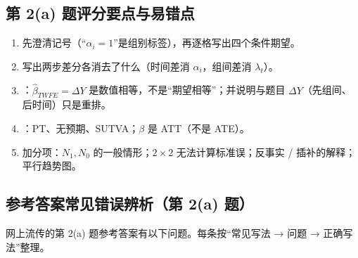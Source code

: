 \subsection{第 2(a) 题评分要点与易错点}

\begin{keypt}[第 2(a) 题评分要点]
\begin{enumerate}
  \item 先澄清记号（“$\alpha_i=1$”是组别标签），再逐格写出四个条件期望。
  \item 写出两步差分各消去了什么（时间差消 $\alpha_i$，组间差消 $\lambda_t$）。
  \item {}：$\hat\beta_{TWFE}=\Delta Y$ 是数值相等，不是“期望相等”；并说明与题目 $\Delta Y$（先组间、后时间）只是重排。
  \item {}：PT、无预期、SUTVA；$\beta$ 是 ATT（不是 ATE）。
  \item 加分项：$N_1,N_0$ 的一般情形；$2\times2$ 无法计算标准误；反事实 / 插补的解释；平行趋势图。
\end{enumerate}
\end{keypt}

\subsection{参考答案常见错误辨析（第 2(a) 题）}\label{sec:U17b-err2a}

网上流传的第 2(a) 题参考答案有以下问题。每条按“常见写法 → 问题 → 正确写法”整理。

